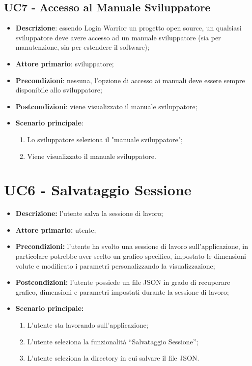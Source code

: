 \subsection{UC7 - Accesso al Manuale Sviluppatore}

\begin{itemize}
  \item \textbf{Descrizione}: essendo Login Warrior un progetto open source, un qualsiasi sviluppatore deve avere accesso ad un manuale sviluppatore (sia per manutenzione, sia per estendere il software);
  \item \textbf{Attore primario}: sviluppatore;
  \item \textbf{Precondizioni}: nessuna, l'opzione di accesso ai manuali deve essere sempre disponibile allo sviluppatore;
  \item \textbf{Postcondizioni}: viene visualizzato il manuale sviluppatore;
  \item \textbf{Scenario principale}:
  \begin{enumerate}
    \item Lo sviluppatore seleziona il "manuale sviluppatore";
    \item Viene visualizzato il manuale sviluppatore.
  \end{enumerate}
\end{itemize}

\section{UC6 - Salvataggio Sessione}

\begin{itemize}
  \item \textbf{Descrizione:} l'utente salva la sessione di lavoro;
  \item \textbf{Attore primario:} utente;
  \item \textbf{Precondizioni:} l'utente ha svolto una sessione di lavoro sull'applicazione, in particolare potrebbe aver scelto un grafico specifico, impostato le dimensioni volute e modificato i parametri personalizzando la visualizzazione;
  \item \textbf{Postcondizioni:} l'utente possiede un file JSON in grado di recuperare grafico, dimensioni e parametri impostati durante la sessione di lavoro;
  \item \textbf{Scenario principale:}
  \begin{enumerate}
    \item L'utente sta lavorando sull'applicazione;
    \item L'utente seleziona la funzionalità ``Salvataggio Sessione'';
    \item L'utente seleziona la directory in cui salvare il file JSON.
  \end{enumerate}
\end{itemize}

